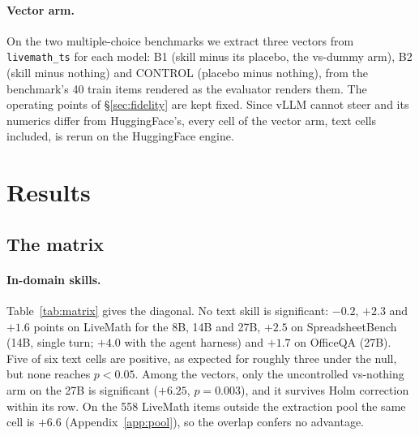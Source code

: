 \documentclass[11pt]{article}
\begin{document}
\paragraph{Vector arm.} On the two multiple-choice benchmarks we extract three vectors from
\texttt{livemath\_ts} for each model: B1 (skill minus its placebo, the vs-dummy arm), B2 (skill minus
nothing) and CONTROL (placebo minus nothing), from the benchmark's 40 train items rendered as the
evaluator renders them. The operating points of \S\ref{sec:fidelity} are kept fixed. Since vLLM
cannot steer and its numerics differ from HuggingFace's, every cell of the vector arm, text cells
included, is rerun on the HuggingFace engine.

\section{Results}

\subsection{The matrix}
\label{sec:matrix}

\paragraph{In-domain skills.} Table~\ref{tab:matrix} gives the diagonal. No text skill is
significant: $-0.2$, $+2.3$ and $+1.6$ points on LiveMath for the 8B, 14B and 27B, $+2.5$ on
SpreadsheetBench (14B, single turn; $+4.0$ with the agent harness) and $+1.7$ on OfficeQA (27B). Five of six text cells are positive, as
expected for roughly three under the null, but none reaches $p<0.05$. Among the vectors, only the
uncontrolled vs-nothing arm on the 27B is significant ($+6.25$, $p=0.003$), and it survives Holm
correction within its row. On the 558 LiveMath items outside the extraction pool the same cell is $+6.6$
(Appendix~\ref{app:pool}), so the overlap confers no advantage.
\end{document}
